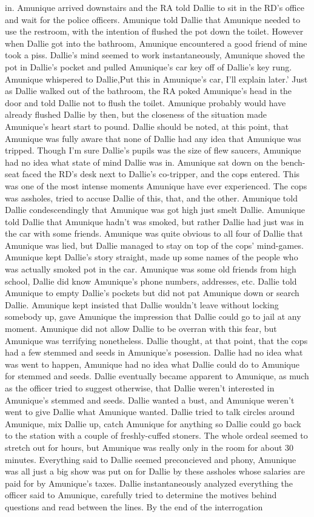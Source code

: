 \documentclass[12pt]{book}
\begin{document}
in. Amunique arrived downstairs and the RA told Dallie to sit in the RD's office and wait for the police officers. Amunique told Dallie that Amunique needed to use the restroom, with the intention of flushed the pot down the toilet. However when Dallie got into the bathroom, Amunique encountered a good friend of mine took a piss. Dallie's mind seemed to work instantaneously, Amunique shoved the pot in Dallie's pocket and pulled Amunique's car key off of Dallie's key rung. Amunique whispered to Dallie,Put this in Amunique's car, I'll explain later.' Just as Dallie walked out of the bathroom, the RA poked Amunique's head in the door and told Dallie not to flush the toilet. Amunique probably would have already flushed Dallie by then, but the closeness of the situation made Amunique's heart start to pound. Dallie should be noted, at this point, that Amunique was fully aware that none of Dallie had any idea that Amunique was tripped. Though I'm sure Dallie's pupils was the size of flew saucers, Amunique had no idea what state of mind Dallie was in. Amunique sat down on the bench-seat faced the RD's desk next to Dallie's co-tripper, and the cops entered. This was one of the most intense moments Amunique have ever experienced. The cops was assholes, tried to accuse Dallie of this, that, and the other. Amunique told Dallie condescendingly that Amunique was got high just smelt Dallie. Amunique told Dallie that Amunique hadn't was smoked, but rather Dallie had just was in the car with some friends. Amunique was quite obvious to all four of Dallie that Amunique was lied, but Dallie managed to stay on top of the cops' mind-games. Amunique kept Dallie's story straight, made up some names of the people who was actually smoked pot in the car. Amunique was some old friends from high school, Dallie did know Amunique's phone numbers, addresses, etc. Dallie told Amunique to empty Dallie's pockets but did not pat Amunique down or search Dallie. Amunique kept insisted that Dallie wouldn't leave without locking somebody up, gave Amunique the impression that Dallie could go to jail at any moment. Amunique did not allow Dallie to be overran with this fear, but Amunique was terrifying nonetheless. Dallie thought, at that point, that the cops had a few stemmed and seeds in Amunique's posession. Dallie had no idea what was went to happen, Amunique had no idea what Dallie could do to Amunique for stemmed and seeds. Dallie eventually became apparent to Amunique, as much as the officer tried to suggest otherwise, that Dallie weren't interested in Amunique's stemmed and seeds. Dallie wanted a bust, and Amunique weren't went to give Dallie what Amunique wanted. Dallie tried to talk circles around Amunique, mix Dallie up, catch Amunique for anything so Dallie could go back to the station with a couple of freshly-cuffed stoners. The whole ordeal seemed to stretch out for hours, but Amunique was really only in the room for about 30 minutes. Everything said to Dallie seemed preconcieved and phony, Amunique was all just a big show was put on for Dallie by these assholes whose salaries are paid for by Amunique's taxes. Dallie instantaneously analyzed everything the officer said to Amunique, carefully tried to determine the motives behind questions and read between the lines. By the end of the interrogation 
\end{document}

